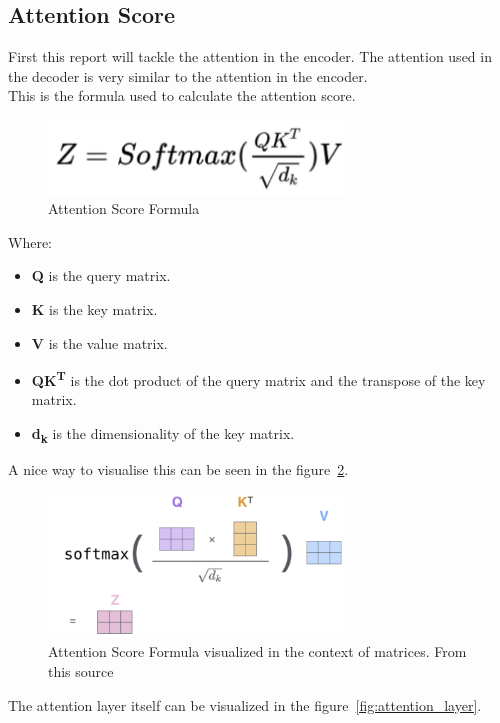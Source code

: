\subsection{Attention Score}
First this report will tackle the attention in the encoder. The attention used in the decoder is very similar to the attention in the encoder. \\
This is the formula used to calculate the attention score.
\begin{figure}[H]
	\centering
	\includegraphics[width=0.7\textwidth]{figures/attention_score_formula.png}
	\caption{Attention Score Formula}
	\label{fig:attention_score}
\end{figure}
Where:
\begin{itemize}
	\item \textbf{Q} is the query matrix.
	\item \textbf{K} is the key matrix.
	\item \textbf{V} is the value matrix.
	\item \textbf{QK\textsuperscript{T}} is the dot product of the query matrix and the transpose of the key matrix.
	\item \textbf{d\textsubscript{k}} is the dimensionality of the key matrix.
\end{itemize}
A nice way to visualise this can be seen in the figure~\cref{fig:attention_score_matrix_form}.
\begin{figure}[H]
	\centering
	\includegraphics[width=0.7\textwidth]{figures/attention_formula_matrix_form.png}
	\caption{Attention Score Formula visualized in the context of matrices. From this source~\autocite{alammarIllustratedTransformer}}
	\label{fig:attention_score_matrix_form}
\end{figure}
The attention layer itself can be visualized in the figure~\cref{fig:attention_layer}.
